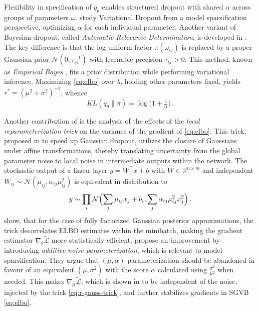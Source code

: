 \documentclass[a4paper,10pt]{article}
\begin{document}
Flexibility in specification of $q_\theta$ enables structured dropout with shared
$\alpha$ across groups of parameters $\omega$. \citet{molchanov_variational_2017} study
Variational Dropout from a model sparsification perspective, optimizing $\alpha$ for each
individual parameter. Another variant of Bayesian dropout, called \textit{Automatic Relevance
Determination}, is developed in \citep{kharitonov_variational_2018}. The key difference is
that the log-uniform factor $\pi(\omega_{ij})$ is replaced by a proper Gaussian prior $
  \mathcal{N}(0, \tau^{-1}_{ij})
$ with learnable precision $\tau_{ij} > 0$. This method, known as \textit{Empirical Bayes}
\citep{citation_needed}, fits a prior distribution while performing variational inference.
Maximizing \eqref{eq:elbo} over $\lambda$, holding other parameters fixed, yields $
  \tau^* = {(\mu^2 + \sigma^2)}^{-1}
$, whence
\begin{equation}  \label{eq:ard-kl-div-real}
  KL(q_\theta \| \pi)
    = \log{\bigl(1 + \tfrac1{\alpha} \bigr)}
    \,.
\end{equation}

Another contribution of \citep{kingma_variational_2015} is the analysis of the effects of the
\textit{local reparameterization trick} on the variance of the gradient of \eqref{eq:elbo}.
This trick, proposed in \citep{wang_fast_2013} to speed up Gaussian dropout, utilizes the
closure of Gaussians under affine transformations, thereby translating uncertainty from the
global parameter noise to local noise in intermediate outputs within the network.
%
The stochastic output of a linear layer $
  y = W^\top x + b
$ with $
  W \in \mathbb{R}^{n\times m}
$ and independent $
  W_{ij} \sim \mathcal{N}(\mu_{ij}, \alpha_{ij} \mu_{ij}^2)
$ is equivalent in distribution to
\begin{equation}  \label{eq:r-gauss-trick}
    y \sim \prod_i \mathcal{N}\Bigl(
          \sum_j \mu_{ij} x_j + b_i,
          \sum_j \alpha_{ij} \mu_{ij}^2 x_j^2
      \Bigr)
    \,.
\end{equation}
%
\citet{kingma_variational_2015} show, that for the case of fully factorized Gaussian
posterior approximations, the trick decorrelates ELBO estimates within the minibatch,
making the gradient estimator $\nabla_\theta \tilde{\mathcal{L}}$ more statistically
efficient. \citet{molchanov_variational_2017} propose an improvement by introducing
\textit{additive noise parameterization}, which is relevant to model sparsification.
They argue that $(\mu, \alpha)$ parameterization should be abandoned in favour of an
equivalent $(\mu, \sigma^2)$ with the score $\alpha$ calculated using $
  \tfrac{\sigma^2}{\mu^2}
$ when needed. This makes $
  \nabla_\mu \tilde{\mathcal{L}}
$, which is shown in \citep{molchanov_variational_2017} to be independent of the noise,
injected by the trick \eqref{eq:r-gauss-trick}, and further stabilizes gradients in SGVB
\eqref{eq:elbo}.
\end{document}
